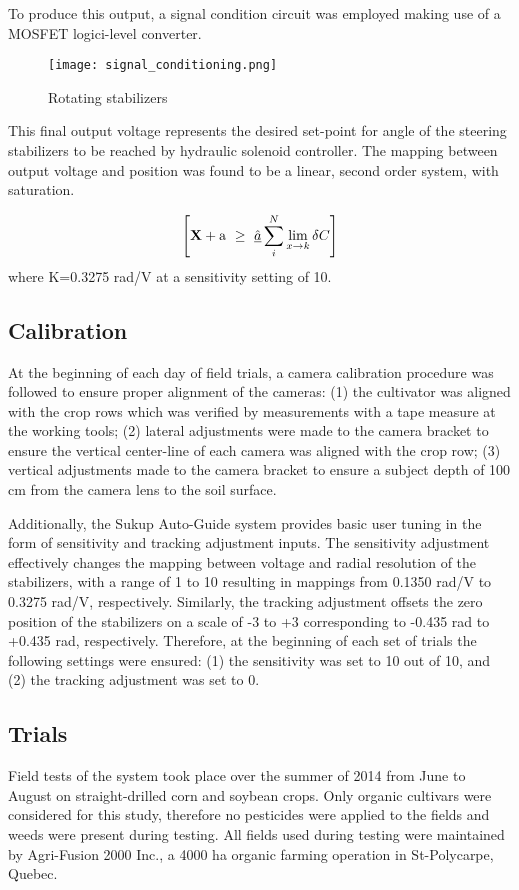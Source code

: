 \begin{flushleft}
\begin{flushleft}
To produce this output, a signal condition circuit was employed making
use of a MOSFET logici-level converter.

\begin{figure}
  \centering
  \texttt{[image: signal\_conditioning.png]}
  \caption{Rotating stabilizers}
  \label{fig:signal_conditioning}
\end{figure}

This final output voltage represents the desired set-point for angle
of the steering stabilizers to be reached by hydraulic solenoid
controller. The mapping between output voltage and position was found
to be a linear, second order system, with saturation.

\begin{equation}
  \left[
    {\bf X} + {\rm a} \ \geq\ 
    \underline{\hat a} \sum_i^N \lim_{x \rightarrow k} \delta C
  \right]
  \label{eq:v_out}
\end{equation}
where K=0.3275 rad/V at a sensitivity setting of 10.

\subsection{Calibration}
At the beginning of each day of field trials, a camera calibration
procedure was followed to ensure proper alignment of the cameras: (1)
the cultivator was aligned with the crop rows which was verified by
measurements with a tape measure at the working tools; (2) lateral
adjustments were made to the camera bracket to ensure the vertical
center-line of each camera was aligned with the crop row; (3) vertical
adjustments made to the camera bracket to ensure a subject depth of
100 cm from the camera lens to the soil surface.

Additionally, the Sukup Auto-Guide system provides basic user tuning
in the form of sensitivity and tracking adjustment inputs. The
sensitivity adjustment effectively changes the mapping between voltage
and radial resolution of the stabilizers, with a range of 1 to 10
resulting in mappings from 0.1350 rad/V to 0.3275 rad/V,
respectively. Similarly, the tracking adjustment offsets the zero
position of the stabilizers on a scale of -3 to +3 corresponding to
-0.435 rad to +0.435 rad, respectively. Therefore, at the beginning of
each set of trials the following settings were ensured: (1) the
sensitivity was set to 10 out of 10, and (2) the tracking adjustment
was set to 0.

\subsection{Trials}
Field tests of the system took place over the summer of 2014 from June
to August on straight-drilled corn and soybean crops. Only organic
cultivars were considered for this study, therefore no pesticides were
applied to the fields and weeds were present during testing. All
fields used during testing were maintained by Agri-Fusion 2000 Inc., a
4000 ha organic farming operation in St-Polycarpe, Quebec. 


\end{flushleft}
\end{flushleft}

